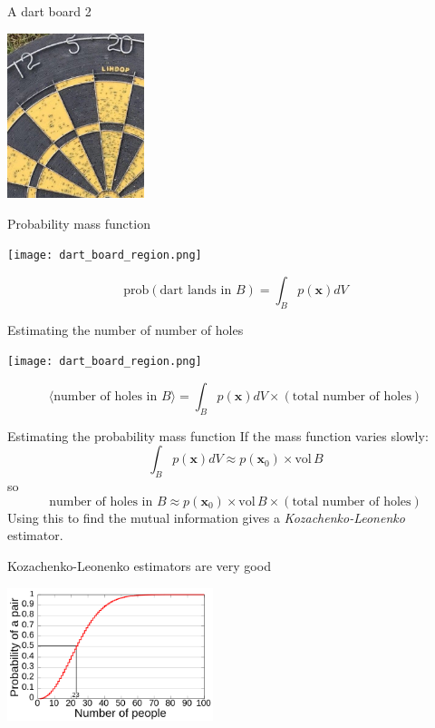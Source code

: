 \documentclass{beamer}
\begin{document}
\begin{frame}{A dart board 2}
\color{reddish}
\begin{center}
\includegraphics[width=4cm]{dart_board_zoom.png}
\end{center}
\color{black}
\end{frame}


\begin{frame}{Probability mass function}
\begin{center}
\texttt{[image: dart\_board\_region.png]}
\end{center}
\color{dark}
$$\mbox{prob}(\mbox{dart lands in }B)=\int_B p(\mathbf{x})dV$$
\color{black}
\end{frame}


\begin{frame}{Estimating the number of number of holes}
\color{reddish}
\begin{center}
\texttt{[image: dart\_board\_region.png]}
\end{center}
\color{black}
$$\langle \mbox{number of holes in }B\rangle = \int_B p(\mathbf{x})dV \times (\mbox{total number of holes})$$
\end{frame}


\begin{frame}{Estimating the probability mass function}
\color{black}
If the mass function varies slowly:
\color{dark}
$$\int_B p(\mathbf{x})dV\approx p(\mathbf{x}_0) \times \mbox{vol}\,B$$
\color{black}
so
\color{dark}
$$\mbox{number of holes in }B \approx p(\mathbf{x}_0) \times \mbox{vol}\,B \times (\mbox{total number of holes})$$
\color{black}
Using this to find the mutual information gives a \textsl{Kozachenko-Leonenko} estimator.
\end{frame}


\begin{frame}{Kozachenko-Leonenko estimators are very good}
\color{reddish}
\begin{center}
\includegraphics[width=6cm]{Birthday_Paradox.png}
\end{center}
\color{black}
\vfill
\color{gray}
\color{black}
\end{frame}
\end{document}

